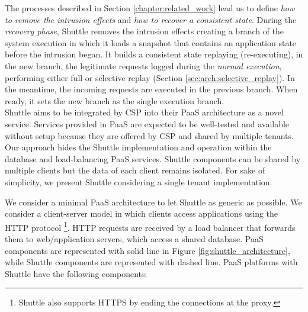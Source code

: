 The processes described in Section \ref{chapter:related_work} lead us to define \textit{how to remove the intrusion effects} and \textit{how to recover a consistent state}. During the \emph{recovery phase}, Shuttle removes the intrusion effects creating a branch of the system execution in which it loads a snapshot that contains an application state before the intrusion began. It builds a consistent state replaying (re-executing), in the new branch, the legitimate requests logged during the \emph{normal execution}, performing either full or selective replay (Section \ref{sec:arch:selective_replay}). In the meantime, the incoming requests are executed in the previous branch. When ready, it sets the new branch as the single execution branch. \\



Shuttle aims to be integrated by \acf{CSP} into their \ac{PaaS} architecture as a novel service. Services provided in \ac{PaaS} are expected to be well-tested and available without setup because they are offered by \ac{CSP} and shared by multiple tenants. Our approach hides the Shuttle implementation and operation within the database and load-balancing \ac{PaaS} services. Shuttle components can be shared by multiple clients but the data of each client remains isolated. For sake of simplicity, we present Shuttle considering a single tenant implementation.

We consider a minimal \ac{PaaS} architecture to let Shuttle as generic as possible. We consider a client-server model in which clients access applications using the \ac{HTTP} protocol \footnote{Shuttle also supports HTTPS by ending the connections at the proxy.}. \ac{HTTP} requests are received by a load balancer that forwards them to web/application servers, which access a shared database. {PaaS} components are represented with solid line in Figure \ref{fig:shuttle_architecture}, while Shuttle components are represented with dashed line. \ac{PaaS} platforms with Shuttle have the following components:

